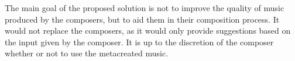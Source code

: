 The main goal of the proposed solution is not to improve the quality of music produced by the composers, but to aid them in their composition process. It would not replace the composers, as it would only provide suggestions based on the input given by the composer. It is up to the discretion of the composer whether or not to use the metacreated music.









